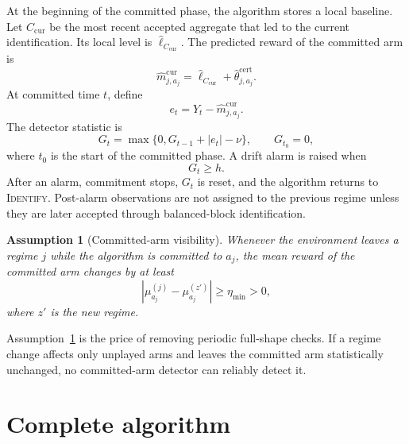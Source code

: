 \documentclass[11pt]{article}
\newtheorem{assumption}{Assumption}
\newcommand{\ID}{\textsc{Identify}\xspace}
\begin{document}
At the beginning of the committed phase, the algorithm stores a local baseline. Let $C_{\mathrm{cur}}$ be the most recent accepted aggregate that led to the current identification. Its local level is $\widehat\ell_{C_{\mathrm{cur}}}$. The predicted reward of the committed arm is
\begin{equation}
    \widehat m_{j,a_j}^{\mathrm{cur}}
    =
    \widehat\ell_{C_{\mathrm{cur}}}
    +
    \widehat\theta_{j,a_j}^{\mathrm{cert}}.
    \label{eq:local-baseline}
\end{equation}
At committed time $t$, define
\begin{equation}
    e_t=Y_t-\widehat m_{j,a_j}^{\mathrm{cur}}.
\end{equation}
The detector statistic is
\begin{equation}
    G_t=\max\{0,G_{t-1}+|e_t|-\nu\},
    \qquad G_{t_0}=0,
    \label{eq:cusum}
\end{equation}
where $t_0$ is the start of the committed phase. A drift alarm is raised when
\begin{equation}
    G_t\geq h.
    \label{eq:alarm}
\end{equation}
After an alarm, commitment stops, $G_t$ is reset, and the algorithm returns to \ID. Post-alarm observations are not assigned to the previous regime unless they are later accepted through balanced-block identification.

\begin{assumption}[Committed-arm visibility]
\label{ass:visibility}
Whenever the environment leaves a regime $j$ while the algorithm is committed to $a_j$, the mean reward of the committed arm changes by at least
\begin{equation}
    \left|\mu_{a_j}^{(j)}-\mu_{a_j}^{(z')}\right|
    \geq
    \eta_{\min}>0,
    \label{eq:visibility}
\end{equation}
where $z'$ is the new regime.
\end{assumption}

Assumption~\ref{ass:visibility} is the price of removing periodic full-shape checks. If a regime change affects only unplayed arms and leaves the committed arm statistically unchanged, no committed-arm detector can reliably detect it.

\section{Complete algorithm}
\end{document}
